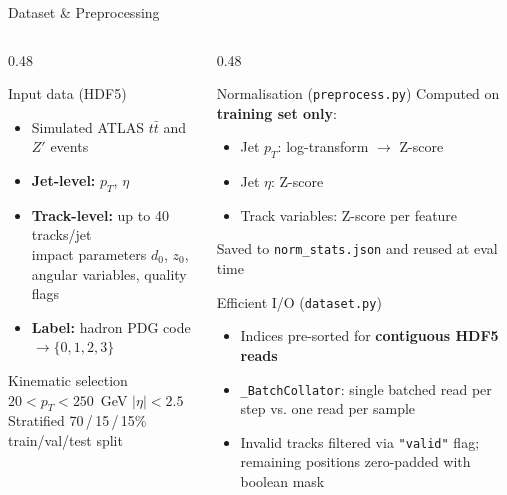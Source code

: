 \documentclass[aspectratio=169, 10pt]{beamer}
\begin{document}
\begin{frame}{Dataset \& Preprocessing}
\begin{columns}[T]
  \begin{column}{0.48\textwidth}
    \begin{block}{Input data (HDF5)}
      \begin{itemize}
        \item Simulated ATLAS $t\bar{t}$ and $Z'$ events
        \item \textbf{Jet-level:} $p_T$, $\eta$
        \item \textbf{Track-level:} up to 40 tracks/jet\\
              impact parameters $d_0$, $z_0$, angular variables,
              quality flags
        \item \textbf{Label:} hadron PDG code $\to \{0,1,2,3\}$
      \end{itemize}
    \end{block}
    \begin{block}{Kinematic selection}
      $20 < p_T < 250$~GeV \quad $|\eta| < 2.5$\\[2pt]
      Stratified 70\,/\,15\,/\,15\% train/val/test split
    \end{block}
  \end{column}
  \begin{column}{0.48\textwidth}
    \begin{block}{Normalisation (\texttt{preprocess.py})}
      Computed on \textbf{training set only}:
      \begin{itemize}
        \item Jet $p_T$: log-transform $\to$ Z-score
        \item Jet $\eta$: Z-score
        \item Track variables: Z-score per feature
      \end{itemize}
      Saved to \texttt{norm\_stats.json} and reused at eval time
    \end{block}
    \begin{block}{Efficient I/O (\texttt{dataset.py})}
      \begin{itemize}
        \item Indices pre-sorted for \textbf{contiguous HDF5 reads}
        \item \texttt{\_BatchCollator}: single batched read per step
          vs. one read per sample
        \item Invalid tracks filtered via \texttt{"valid"} flag;
          remaining positions zero-padded with boolean mask
      \end{itemize}
    \end{block}
  \end{column}
\end{columns}
\end{frame}
\end{document}
